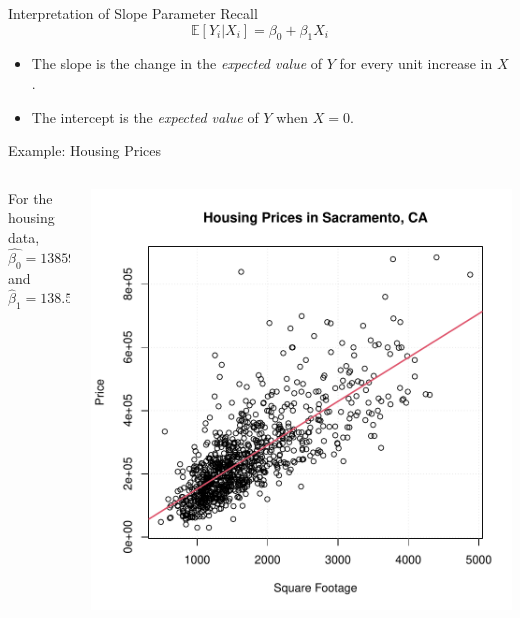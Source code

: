 \documentclass{beamer}
\begin{document}
\begin{frame}{Interpretation of Slope Parameter}
    Recall 
    \begin{equation*}
        \mathbb{E}[Y_i | X_i] = \beta_0 + \beta_1 X_i
    \end{equation*}
    \begin{itemize}
        \item The slope is the change in the \textit{expected value} of $Y$ for every unit increase in $X$. 
        \item The intercept is the \textit{expected value} of $Y$ when $X = 0$.
    \end{itemize}
\end{frame}

\begin{frame}{Example: Housing Prices}
    \begin{columns}
        \begin{column}{0.5\linewidth}
            For the housing data, 
            \begin{equation*}
                \hat{\beta_0} = 13859.393
            \end{equation*}
            and 
            \begin{equation*}
                \hat{\beta}_1 = 138.546
            \end{equation*}
        \end{column}
        \begin{column}{0.5\linewidth}
            \includegraphics[width=\linewidth]{figures/sacramento_ls.pdf}
        \end{column}
    \end{columns}
\end{frame}
\end{document}
